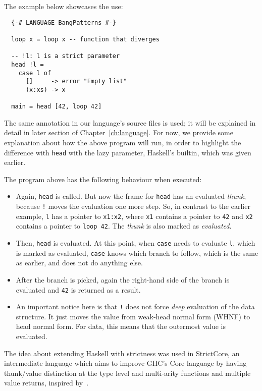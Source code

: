 \documentclass[diploma]{softlab-thesis}
\begin{document}
The example below showcases the use:
\begin{verbatim}
  {-# LANGUAGE BangPatterns #-}

  loop x = loop x -- function that diverges

  -- !l: l is a strict parameter
  head !l = 
    case l of 
      []     -> error "Empty list"
      (x:xs) -> x

  main = head [42, loop 42]
\end{verbatim}

The same annotation in our language's source files is used; it will be explained in detail in later section of 
Chapter~\ref{ch:language}. For now, we provide some explanation about how the above program will run, in order to highlight 
the difference with \texttt{head} with the lazy parameter, Haskell's builtin, which was given earlier. 

The program above has the following behaviour when executed:
\begin{itemize}
  \item Again, \texttt{head} is called. But now the frame for \texttt{head} has an evaluated \textit{thunk}, because \texttt{!} moves the 
  evaluation one more step. So, in contrast to the earlier example, \texttt{l} has a pointer to \texttt{x1:x2}, where \texttt{x1} contains a pointer to 
  \texttt{42} and \texttt{x2} contains a pointer to \texttt{loop 42}. The \textit{thunk} is also marked as \textit{evaluated}.
  \item Then, \texttt{head} is evaluated. At this point, when \texttt{case} needs to evaluate \texttt{l}, which is marked as evaluated, \texttt{case} knows 
  which branch to follow, which is the same as earlier, and does not do anything else.
  \item After the branch is picked, again the right-hand side of the branch is evaluated and \texttt{42} is returned as a result.
  \item An important notice here is that \texttt{!} does not force \textit{deep} evaluation of the data structure. It just moves the 
  value from weak-head normal form (WHNF) to head normal form. For data, this means that the outermost value is evaluated.
\end{itemize}

The idea about extending Haskell with strictness was used in StrictCore, an intermediate language 
which aims to improve GHC's Core language by having
thunk/value distinction at the type level and multi-arity functions and multiple value returns, 
inspired by~\cite{Bol09}.
\end{document}
